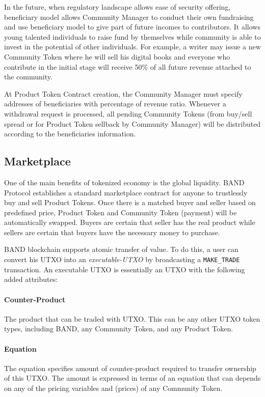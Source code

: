 \documentclass[letterpaper,11pt]{article}
\begin{document}
In the future, when regulatory landscape allows ease of security offering, beneficiary model allows Community Manager to conduct their own fundraising and use beneficiary model to give part of future incomes to contributors. It allows young talented individuals to raise fund by themselves while community is able to invest in the potential of other individuals. For example, a writer may issue a new Community Token where he will sell his digital books and everyone who contribute in the initial stage will receive 50\% of all future revenue attached to the community.

At Product Token Contract creation, the Community Manager must specify addresses of beneficiaries with percentage of revenue ratio. Whenever a withdrawal request is processed, all pending Community Tokens (from buy/sell spread or for Product Token sellback by Community Manager) will be distributed according to the beneficiaries information.

\subsection{Marketplace} \label{sec:marketplace}
One of the main benefits of tokenized economy is the global liquidity. BAND Protocol establishes a standard marketplace contract for anyone to trustlessly buy and sell Product Tokens. Once there is a matched buyer and seller based on predefined price, Product Token and Community Token (payment) will be automatically swapped. Buyers are certain that seller has the real product while sellers are certain that buyers have the necessary money to purchase.

BAND blockchain supports atomic transfer of value. To do this, a user can convert his UTXO into an \emph{executable-UTXO} by broadcasting a {\tt MAKE\_TRADE} transaction. An executable UTXO is essentially an UTXO with the following added attributes:
\paragraph{Counter-Product} The product that can be traded with UTXO. This can be any other UTXO token types, including BAND, any Community Token, and any Product Token.
\paragraph{Equation} The equation specifies amount of counter-product required to transfer ownership of this UTXO. The amount is expressed in terms of an equation that can depends on any of the pricing variables and (prices) of any Community Token. \\
\end{document}
